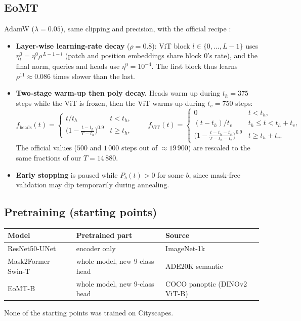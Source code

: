 \documentclass[11pt,a4paper]{article}
\newcommand{\1}{\mathbb{1}}
\begin{document}
\subsection{EoMT}

AdamW ($\lambda=0.05$), same clipping and precision, with the official
recipe \cite{kerssies2025vitsecretlyimagesegmentation}:
\begin{itemize}[leftmargin=1.5em]
\item \textbf{Layer-wise learning-rate decay} ($\rho = 0.8$): ViT block
  $l\in\{0,\dots,L-1\}$ uses $\eta^0_l = \eta^0\rho^{\,L-1-l}$ (patch and
  position embeddings share block 0's rate), and the final norm, queries and
  heads use $\eta^0 = 10^{-4}$. The first block thus learns
  $\rho^{11}\approx 0.086$ times slower than the last.
\item \textbf{Two-stage warm-up then poly decay.} Heads warm up during
  $t_h=375$ steps while the ViT is frozen, then the ViT warms up during
  $t_v=750$ steps:
  \[
  f_{\text{heads}}(t) =
  \begin{cases}
  t/t_h & t<t_h,\\
  \big(1-\frac{t-t_h}{T-t_h}\big)^{0.9} & t\ge t_h,
  \end{cases}
  \qquad
  f_{\text{ViT}}(t) =
  \begin{cases}
  0 & t<t_h,\\
  (t-t_h)/t_v & t_h\le t<t_h+t_v,\\
  \big(1-\frac{t-t_h-t_v}{T-t_h-t_v}\big)^{0.9} & t\ge t_h+t_v .
  \end{cases}
  \]
  The official values ($500$ and $1\,000$ steps out of $\approx19\,900$) are
  rescaled to the same fractions of our $T = 14\,880$.
\item \textbf{Early stopping} is paused while $P_b(t)>0$ for some $b$, since
  mask-free validation may dip temporarily during annealing.
\end{itemize}

\subsection{Pretraining (starting points)}

\begin{center}
\begin{tabular}{lll}
\toprule
Model & Pretrained part & Source \\
\midrule
ResNet50-UNet & encoder only & ImageNet-1k \\
Mask2Former Swin-T & whole model, new 9-class head & ADE20K semantic \\
EoMT-B & whole model, new 9-class head & COCO panoptic (DINOv2 ViT-B) \\
\bottomrule
\end{tabular}
\end{center}
None of the starting points was trained on Cityscapes.
\end{document}
